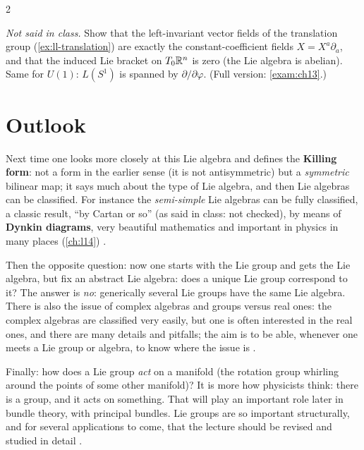 \begin{paracol}{2}
\begin{exercise}\label{ex:ll-translation-ex}
\emph{Not said in class.} Show that the left-invariant vector fields of the translation group (\cref{ex:ll-translation}) are exactly the constant-coefficient fields $X=X^a\partial_a$, and that the induced Lie bracket on $T_0\mathbb{R}^n$ is zero (the Lie algebra is abelian). Same for $U(1)$: $L(S^1)$ is spanned by $\partial/\partial\varphi$. (Full version: \cref{exam:ch13}.)
\end{exercise}

\section{Outlook}\label{sec:ll-outlook}

Next time one looks more closely at this Lie algebra and defines the \textbf{Killing form}: not a form in the earlier sense (it is not antisymmetric) but a \emph{symmetric} bilinear map; it says much about the type of Lie algebra, and then Lie algebras can be classified. For instance the \emph{semi-simple} Lie algebras can be fully classified, a classic result, ``by Cartan or so'' (as said in class: not checked), by means of \textbf{Dynkin diagrams}, very beautiful mathematics and important in physics in many places (\cref{ch:l14})  .

Then the opposite question: now one starts with the Lie group and gets the Lie algebra, but fix an abstract Lie algebra: does a unique Lie group correspond to it? The answer is \emph{no}: generically several Lie groups have the same Lie algebra. There is also the issue of complex algebras and groups versus real ones: the complex algebras are classified very easily, but one is often interested in the real ones, and there are many details and pitfalls; the aim is to be able, whenever one meets a Lie group or algebra, to know where the issue is   .

Finally: how does a Lie group \emph{act} on a manifold (the rotation group whirling around the points of some other manifold)? It is more how physicists think: there is a group, and it acts on something. That will play an important role later in bundle theory, with principal bundles. Lie groups are so important structurally, and for several applications to come, that the lecture should be revised and studied in detail  .


\end{paracol}
